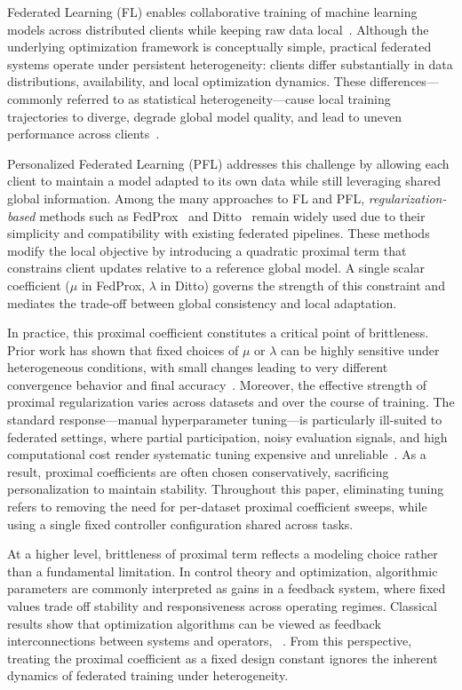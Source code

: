 \documentclass[letterpaper]{article} %
\begin{document}
Federated Learning (FL) enables collaborative training of machine learning models across distributed clients while keeping raw data local~\cite{mcmahan2017communication}. Although the underlying optimization framework is conceptually simple, practical federated systems operate under persistent heterogeneity: clients differ substantially in data distributions, availability, and local optimization dynamics. These differences—commonly referred to as statistical heterogeneity—cause local training trajectories to diverge, degrade global model quality, and lead to uneven performance across clients~\cite{mcmahan2017communication}.

Personalized Federated Learning (PFL) addresses this challenge by allowing each client to maintain a model adapted to its own data while still leveraging shared global information. Among the many approaches to FL and PFL, \emph{regularization-based} methods such as FedProx~\cite{li2020federated} and Ditto~\cite{li2021ditto} remain widely used due to their simplicity and compatibility with existing federated pipelines. These methods modify the local objective by introducing a quadratic proximal term that constrains client updates relative to a reference global model. A single scalar coefficient ($\mu$ in FedProx, $\lambda$ in Ditto) governs the strength of this constraint and mediates the trade-off between global consistency and local adaptation.

In practice, this proximal coefficient constitutes a critical point of brittleness. Prior work has shown that fixed choices of $\mu$ or $\lambda$ can be highly sensitive under heterogeneous conditions, with small changes leading to very different convergence behavior and final accuracy~\cite{yu2024effect, li2020federated, li2021ditto}. Moreover, the effective strength of proximal regularization varies across datasets and over the course of training. The standard response—manual hyperparameter tuning—is particularly ill-suited to federated settings, where partial participation, noisy evaluation signals, and high computational cost render systematic tuning expensive and unreliable~\cite{kuo2023noisy}. As a result, proximal coefficients are often chosen conservatively, sacrificing personalization to maintain stability. Throughout this paper, eliminating tuning refers to removing the need for per-dataset proximal coefficient sweeps, while using a single fixed controller configuration shared across tasks.

At a higher level, brittleness of proximal term reflects a modeling choice rather than a fundamental limitation. In control theory and optimization, algorithmic parameters are commonly interpreted as gains in a feedback system, where fixed values trade off stability and responsiveness across operating regimes. Classical results show that optimization algorithms can be viewed as feedback interconnections between systems and operators, ~\cite{lessard2016analysis}. From this perspective, treating the proximal coefficient as a fixed design constant ignores the inherent dynamics of federated training under heterogeneity.
\end{document}

